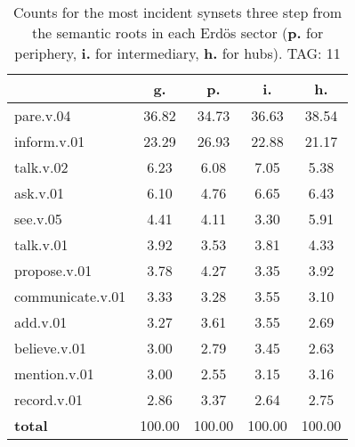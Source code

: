 \begin{table}[h!]
\begin{center}
\begin{tabular}{| l || c | c | c | c |}\hline
 & {\bf g.} & {\bf p.} & {\bf i.} & {\bf h.} \\\hline\hline
pare.v.04 & 36.82  & 34.73  & 36.63  & 38.54 \\\hline
inform.v.01 & 23.29  & 26.93  & 22.88  & 21.17 \\\hline
talk.v.02 & 6.23  & 6.08  & 7.05  & 5.38 \\\hline
ask.v.01 & 6.10  & 4.76  & 6.65  & 6.43 \\\hline
see.v.05 & 4.41  & 4.11  & 3.30  & 5.91 \\\hline
talk.v.01 & 3.92  & 3.53  & 3.81  & 4.33 \\\hline
propose.v.01 & 3.78  & 4.27  & 3.35  & 3.92 \\\hline
communicate.v.01 & 3.33  & 3.28  & 3.55  & 3.10 \\\hline
add.v.01 & 3.27  & 3.61  & 3.55  & 2.69 \\\hline
believe.v.01 & 3.00  & 2.79  & 3.45  & 2.63 \\\hline
mention.v.01 & 3.00  & 2.55  & 3.15  & 3.16 \\\hline
record.v.01 & 2.86  & 3.37  & 2.64  & 2.75 \\\hline\hline
{{\bf total}} & 100.00  & 100.00  & 100.00  & 100.00 \\\hline
\end{tabular}
\caption{Counts for the most incident synsets three step from the semantic roots in each Erd\"os sector ({\bf p.} for periphery, {\bf i.} for intermediary, {\bf h.} for hubs). TAG: 11}
\end{center}
\end{table}